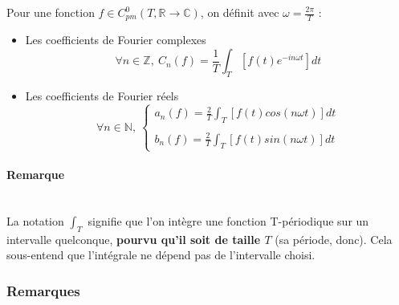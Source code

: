\documentclass[12pt, a4paper]{article}
\newcommand{\myparagraph}[1]{\paragraph{#1}\mbox{}\\}
\begin{document}
\begin{tcolorbox}
	Pour une fonction $f \in C_{pm}^0(T, \mathbb{R} \to \mathbb{C})$, on définit avec $\displaystyle\omega = \frac{2\pi}{T}$ :
	\begin{itemize}
		\item Les coefficients de Fourier complexes
			\begin{equation*}
				\forall n \in \mathbb{Z}, ~ C_n(f) = \frac{1}{T} \int_T [f(t)e^{-in\omega t}]dt
			\end{equation*}
		\item Les coefficients de Fourier réels
			\begin{equation*}
				\forall n \in \mathbb{N}, ~ 
				\begin{cases}
					\displaystyle
					a_n(f) = \frac{2}{T} \int_T [f(t) cos(n\omega t)]dt \\
					{} \\
					\displaystyle
					b_n(f) = \frac{2}{T} \int_T [f(t) sin(n\omega t)]dt
				\end{cases}
			\end{equation*}
	\end{itemize}
\end{tcolorbox}

\myparagraph{Remarque}

La notation $\displaystyle\int_T$ signifie que l'on intègre une fonction T-périodique sur un intervalle quelconque, \textbf{pourvu qu'il soit de taille $T$} (sa période, donc). Cela sous-entend que l'intégrale ne dépend pas de l'intervalle choisi.

\subsubsection{Remarques}
\end{document}
